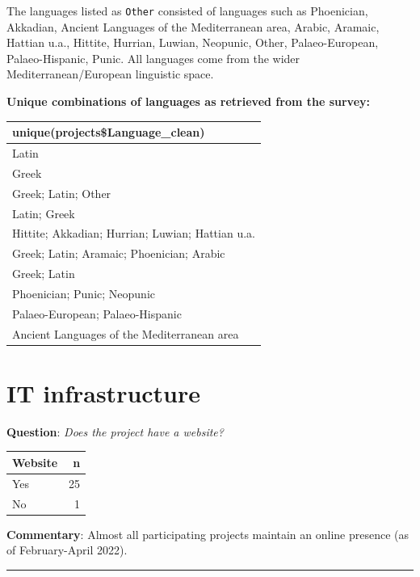 \documentclass[
  12pt,
]{scrreprt}
\begin{document}
The languages listed as \texttt{Other} consisted of languages such as
Phoenician, Akkadian, Ancient Languages of the Mediterranean area,
Arabic, Aramaic, Hattian u.a., Hittite, Hurrian, Luwian, Neopunic,
Other, Palaeo-European, Palaeo-Hispanic, Punic. All languages come from
the wider Mediterranean/European linguistic space.

\textbf{Unique combinations of languages as retrieved from the survey:}

\footnotesize

\begin{longtable}[]{@{}l@{}}
\toprule
unique(projects\$Language\_clean) \\
\midrule
\endhead
Latin \\
Greek \\
Greek; Latin; Other \\
Latin; Greek \\
Hittite; Akkadian; Hurrian; Luwian; Hattian u.a. \\
Greek; Latin; Aramaic; Phoenician; Arabic \\
Greek; Latin \\
Phoenician; Punic; Neopunic \\
Palaeo-European; Palaeo-Hispanic \\
Ancient Languages of the Mediterranean area \\
\bottomrule
\end{longtable}

\normalsize

\hypertarget{it-infrastructure-1}{%
\section{IT infrastructure}\label{it-infrastructure-1}}

\textbf{Question}: \emph{Does the project have a website?}

\footnotesize

\begin{longtable}[]{@{}lr@{}}
\toprule
Website & n \\
\midrule
\endhead
Yes & 25 \\
No & 1 \\
\bottomrule
\end{longtable}

\normalsize

\textbf{Commentary}: Almost all participating projects maintain an
online presence (as of February-April 2022).

\begin{center}\rule{0.5\linewidth}{0.5pt}\end{center}
\end{document}
